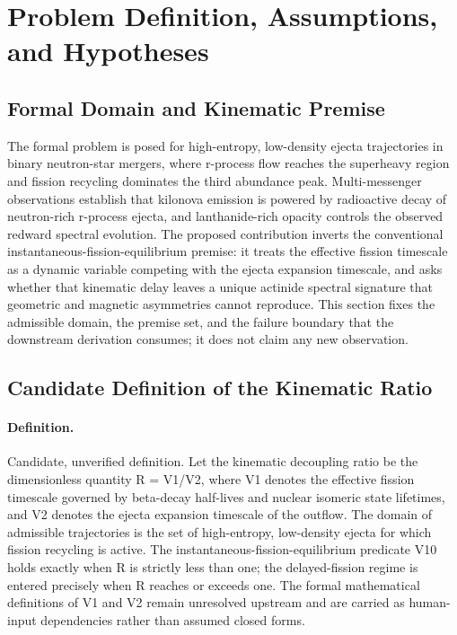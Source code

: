 \documentclass[conference]{IEEEtran}
\begin{document}
\section{Problem Definition, Assumptions, and Hypotheses}
\subsection{Formal Domain and Kinematic Premise}
The formal problem is posed for high-entropy, low-density ejecta trajectories in binary neutron-star mergers, where r-process flow reaches the superheavy region and fission recycling dominates the third abundance peak. Multi-messenger observations establish that kilonova emission is powered by radioactive decay of neutron-rich r-process ejecta, and lanthanide-rich opacity controls the observed redward spectral evolution. The proposed contribution inverts the conventional instantaneous-fission-equilibrium premise: it treats the effective fission timescale as a dynamic variable competing with the ejecta expansion timescale, and asks whether that kinematic delay leaves a unique actinide spectral signature that geometric and magnetic asymmetries cannot reproduce. This section fixes the admissible domain, the premise set, and the failure boundary that the downstream derivation consumes; it does not claim any new observation.~\cite{cite_07d6df5d6978a1fc,cite_612290131318c0d4}

\subsection{Candidate Definition of the Kinematic Ratio}
\paragraph{Definition.} Candidate, unverified definition. Let the kinematic decoupling ratio be the dimensionless quantity R = V1/V2, where V1 denotes the effective fission timescale governed by beta-decay half-lives and nuclear isomeric state lifetimes, and V2 denotes the ejecta expansion timescale of the outflow. The domain of admissible trajectories is the set of high-entropy, low-density ejecta for which fission recycling is active. The instantaneous-fission-equilibrium predicate V10 holds exactly when R is strictly less than one; the delayed-fission regime is entered precisely when R reaches or exceeds one. The formal mathematical definitions of V1 and V2 remain unresolved upstream and are carried as human-input dependencies rather than assumed closed forms.
\end{document}
